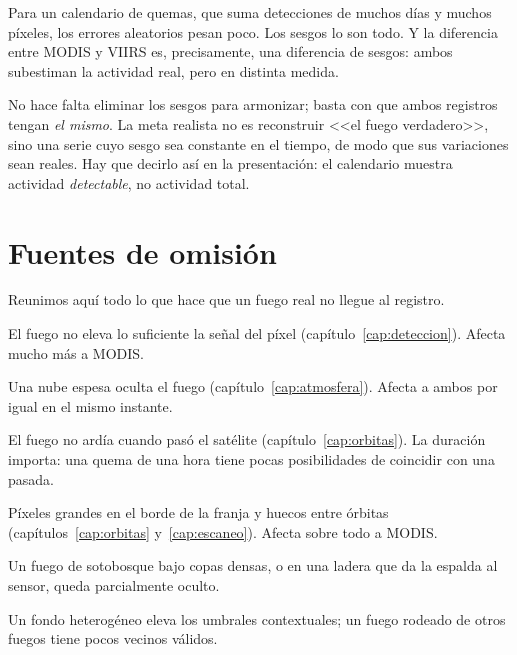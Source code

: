 Para un calendario de quemas, que suma detecciones de muchos días y muchos píxeles, los errores
aleatorios pesan poco. Los sesgos lo son todo. Y la diferencia entre MODIS y VIIRS es,
precisamente, una diferencia de sesgos: ambos subestiman la actividad real, pero en distinta
medida.

\begin{parareto}
No hace falta eliminar los sesgos para armonizar; basta con que ambos registros tengan
\emph{el mismo}. La meta realista no es reconstruir <<el fuego verdadero>>, sino una serie cuyo
sesgo sea constante en el tiempo, de modo que sus variaciones sean reales. Hay que decirlo así
en la presentación: el calendario muestra actividad \emph{detectable}, no actividad total.
\end{parareto}

\section{Fuentes de omisión}

Reunimos aquí todo lo que hace que un fuego real no llegue al registro.

\begin{description}[leftmargin=1.2em,style=nextline]
  \item[Tamaño y temperatura.] El fuego no eleva lo suficiente la señal del píxel
  (capítulo~\ref{cap:deteccion}). Afecta mucho más a MODIS.
  \item[Nubes.] Una nube espesa oculta el fuego (capítulo~\ref{cap:atmosfera}). Afecta a ambos
  por igual en el mismo instante.
  \item[Hora.] El fuego no ardía cuando pasó el satélite (capítulo~\ref{cap:orbitas}). La
  duración importa: una quema de una hora tiene pocas posibilidades de coincidir con una pasada.
  \item[Geometría.] Píxeles grandes en el borde de la franja y huecos entre órbitas
  (capítulos~\ref{cap:orbitas} y~\ref{cap:escaneo}). Afecta sobre todo a MODIS.
  \item[Dosel y relieve.] Un fuego de sotobosque bajo copas densas, o en una ladera que da la
  espalda al sensor, queda parcialmente oculto.
  \item[Entorno.] Un fondo heterogéneo eleva los umbrales contextuales; un fuego rodeado de
  otros fuegos tiene pocos vecinos válidos.
\end{description}

